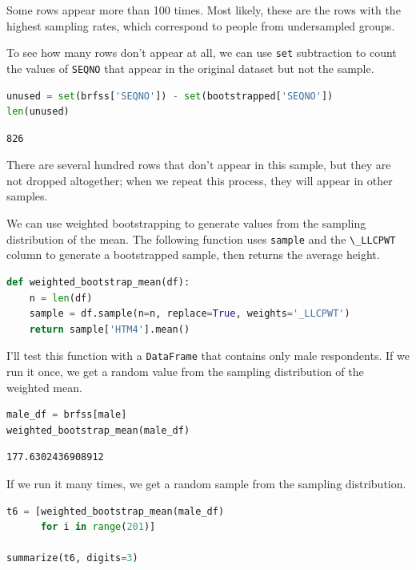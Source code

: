 Some rows appear more than 100 times. Most likely, these are the rows
with the highest sampling rates, which correspond to people from
undersampled groups.

To see how many rows don't appear at all, we can use
\passthrough{\lstinline!set!} subtraction to count the values of
\passthrough{\lstinline!SEQNO!} that appear in the original dataset but
not the sample.

\begin{lstlisting}[language=Python,style=source]
unused = set(brfss['SEQNO']) - set(bootstrapped['SEQNO'])
len(unused)
\end{lstlisting}

\begin{lstlisting}[style=output]
826
\end{lstlisting}

There are several hundred rows that don't appear in this sample, but
they are not dropped altogether; when we repeat this process, they will
appear in other samples.

We can use weighted bootstrapping to generate values from the sampling
distribution of the mean. The following function uses
\passthrough{\lstinline!sample!} and the
\passthrough{\lstinline!\_LLCPWT!} column to generate a bootstrapped
sample, then returns the average height.

\begin{lstlisting}[language=Python,style=source]
def weighted_bootstrap_mean(df):
    n = len(df)
    sample = df.sample(n=n, replace=True, weights='_LLCPWT')
    return sample['HTM4'].mean()
\end{lstlisting}

I'll test this function with a \passthrough{\lstinline!DataFrame!} that
contains only male respondents. If we run it once, we get a random value
from the sampling distribution of the weighted mean.

\begin{lstlisting}[language=Python,style=source]
male_df = brfss[male]
weighted_bootstrap_mean(male_df)
\end{lstlisting}

\begin{lstlisting}[style=output]
177.6302436908912
\end{lstlisting}

If we run it many times, we get a random sample from the sampling
distribution.

\begin{lstlisting}[language=Python,style=source]
t6 = [weighted_bootstrap_mean(male_df) 
      for i in range(201)]

summarize(t6, digits=3)
\end{lstlisting}

